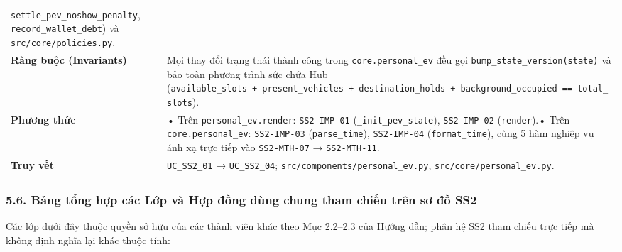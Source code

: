 \documentclass[11pt,a4paper]{article}
\begin{document}
\begin{longtable}[]{@{}
  >{\raggedright\arraybackslash}p{}
  >{\raggedright\arraybackslash}p{}@{}}
\texttt{settle\_pev\_noshow\_penalty}, \texttt{record\_wallet\_debt}) và
\texttt{src/core/policies.py}. \\
\textbf{Ràng buộc (Invariants)} & Mọi thay đổi trạng thái thành công
trong \texttt{core.personal\_ev} đều gọi
\texttt{bump\_state\_version(state)} và bảo toàn phương trình sức chứa
Hub
(\texttt{available\_slots\ +\ present\_vehicles\ +\ destination\_holds\ +\ background\_occupied\ ==\ total\_slots}). \\
\textbf{Phương thức} & • Trên \texttt{personal\_ev.render}:
\texttt{SS2-IMP-01} (\texttt{\_init\_pev\_state}), \texttt{SS2-IMP-02}
(\texttt{render}).• Trên \texttt{core.personal\_ev}: \texttt{SS2-IMP-03}
(\texttt{parse\_time}), \texttt{SS2-IMP-04} (\texttt{format\_time}),
cùng 5 hàm nghiệp vụ ánh xạ trực tiếp vào \texttt{SS2-MTH-07} →
\texttt{SS2-MTH-11}. \\
\textbf{Truy vết} & \texttt{UC\_SS2\_01} → \texttt{UC\_SS2\_04};
\texttt{src/components/personal\_ev.py},
\texttt{src/core/personal\_ev.py}. \\
\end{longtable}

\hypertarget{bux1ea3ng-tux1ed5ng-hux1ee3p-cuxe1c-lux1edbp-vuxe0-hux1ee3p-ux111ux1ed3ng-duxf9ng-chung-tham-chiux1ebfu-truxean-sux1a1-ux111ux1ed3-ss2}{%
\subsubsection{5.6. Bảng tổng hợp các Lớp và Hợp đồng dùng chung tham
chiếu trên sơ đồ
SS2}\label{bux1ea3ng-tux1ed5ng-hux1ee3p-cuxe1c-lux1edbp-vuxe0-hux1ee3p-ux111ux1ed3ng-duxf9ng-chung-tham-chiux1ebfu-truxean-sux1a1-ux111ux1ed3-ss2}}

Các lớp dưới đây thuộc quyền sở hữu của các thành viên khác theo Mục
2.2--2.3 của Hướng dẫn; phân hệ SS2 tham chiếu trực tiếp mà không định
nghĩa lại khác thuộc tính:
\end{document}
